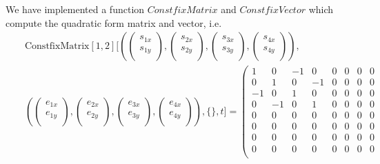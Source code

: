 \documentclass[8pt]{article}
\begin{document}
\begin{screen}
 We have implemented a function $ConstfixMatrix$ and $ConstfixVector$ which compute the
 quadratic form matrix and vector, i.e.
\begin{eqnarray*}
&&\text{ConstfixMatrix}[1,2][(\left(\begin{array}{c}
s_{1x}\\
s_{1y}\\
\end{array}\right),\left(\begin{array}{c}
s_{2x}\\
s_{2y}\\
\end{array}\right),\left(\begin{array}{c}
s_{3x}\\
s_{3y}\\
\end{array}\right),\left(\begin{array}{c}
s_{4x}\\
s_{4y}\\
\end{array}\right)),\\
&&(\left(\begin{array}{c}
e_{1x}\\
e_{1y}\\
\end{array}\right),\left(\begin{array}{c}
e_{2x}\\
e_{2y}\\
\end{array}\right),\left(\begin{array}{c}
e_{3x}\\
e_{3y}\\
\end{array}\right),\left(\begin{array}{c}
e_{4x}\\
e_{4y}\\
\end{array}\right)), \{\}, t]= \left(
 \begin{array}{cccccccc}
 1&0&-1&0&0&0&0&0\\
 0&1&0&-1&0&0&0&0\\
 -1&0&1&0&0&0&0&0\\
 0&-1&0&1&0&0&0&0\\
 0&0&0&0&0&0&0&0\\
 0&0&0&0&0&0&0&0\\
 0&0&0&0&0&0&0&0\\
 0&0&0&0&0&0&0&0\\

\end{array}
\end{eqnarray*}
\end{screen}
\end{document}
